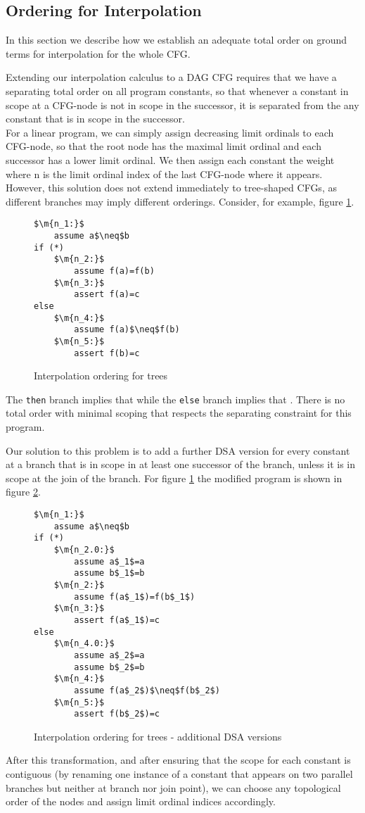 \subsection{Ordering for Interpolation}
In this section we describe how we establish an adequate total order on ground terms for interpolation for the whole CFG.

Extending our interpolation calculus to a DAG CFG requires that we have a separating total order on all program constants, so that whenever a constant in scope at a CFG-node is not in scope in the successor, it is separated from the any constant that is in scope in the successor.\\
For a linear program, we can simply assign decreasing limit ordinals to each CFG-node, so that the root node has the maximal limit ordinal and each successor has a lower limit ordinal. We then assign each constant the weight  where n is the limit ordinal index of the last CFG-node where it appears.\\
However, this solution does not extend immediately to tree-shaped CFGs, as different branches may imply different orderings. Consider, for example, figure \ref{snippet4.5.1}.

\begin{figure}
\begin{lstlisting}
$\m{n_1:}$
	assume a$\neq$b
if (*)
	$\m{n_2:}$
		assume f(a)=f(b)
	$\m{n_3:}$
		assert f(a)=c
else
	$\m{n_4:}$
		assume f(a)$\neq$f(b)
	$\m{n_5:}$
		assert f(b)=c
\end{lstlisting}
\caption{Interpolation ordering for trees}
\label{snippet4.5.1}
\end{figure}

The \lstinline|then| branch implies that  while the \lstinline|else|  branch implies that .
There is no total order with minimal scoping that respects the separating constraint for this program.

Our solution to this problem is to add a further DSA version for every constant at a branch that is in scope in at least one successor of the branch, unless it is in scope at the join of the branch.
For figure \ref{snippet4.5.1} the modified program is shown in figure \ref{snippet4.5.1b}.

\begin{figure}
\begin{lstlisting}
$\m{n_1:}$
	assume a$\neq$b
if (*)
	$\m{n_2.0:}$
		assume a$_1$=a
		assume b$_1$=b
	$\m{n_2:}$
		assume f(a$_1$)=f(b$_1$)
	$\m{n_3:}$
		assert f(a$_1$)=c
else
	$\m{n_4.0:}$
		assume a$_2$=a
		assume b$_2$=b
	$\m{n_4:}$
		assume f(a$_2$)$\neq$f(b$_2$)
	$\m{n_5:}$
		assert f(b$_2$)=c
\end{lstlisting}
\caption{Interpolation ordering for trees - additional DSA versions}
\label{snippet4.5.1b}
\end{figure}

After this transformation, and after ensuring that the scope for each constant is contiguous (by renaming one instance of a constant that appears on two parallel branches but neither at branch nor join point), we can choose any topological order of the nodes and assign limit ordinal indices accordingly.
